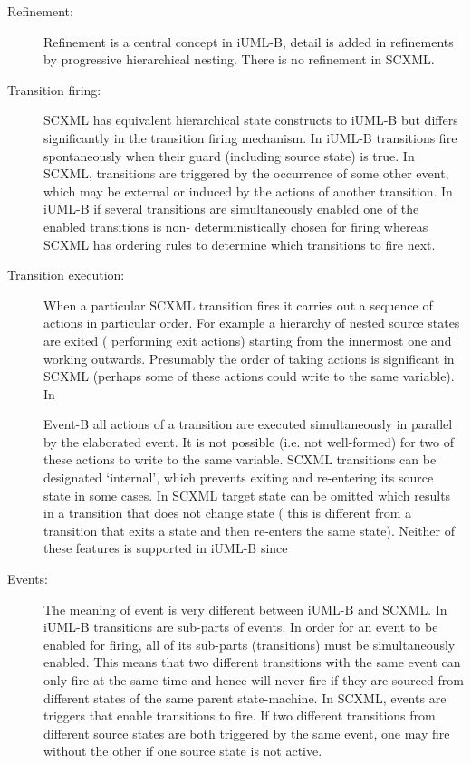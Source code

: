 \documentclass{easychair}
\begin{document}
\begin{description}
\item [Refinement:]
Refinement is a central concept in iUML-B, detail is 
added in refinements by progressive hierarchical 
nesting. There is no refinement in SCXML.

\item [Transition firing:]
SCXML has equivalent hierarchical state constructs to 
iUML-B but differs significantly in the transition 
firing mechanism. In iUML-B transitions fire 
spontaneously when their guard (including source state) 
is true. In SCXML, transitions are triggered by the 
occurrence of some other event, which may be external 
or induced by the actions of another transition. 
In iUML-B if several transitions are simultaneously 
enabled one of the enabled transitions is non-
deterministically chosen for firing whereas SCXML has 
ordering rules to determine which transitions to fire 
next.

\item [Transition execution:]
When a particular SCXML transition fires it carries out 
a sequence of actions in particular order. For example 
a hierarchy of nested source states are exited (
performing exit actions) starting from the innermost 
one and working outwards. Presumably the order of 
taking actions is significant in SCXML (perhaps some of 
these actions could write to the same variable). In 

Event-B all actions of a transition are executed 
simultaneously in parallel by the elaborated event. It 
is not possible (i.e. not well-formed) for two of these 
actions to write to the same variable.
SCXML transitions can be designated ‘internal’, which 
prevents exiting and re-entering its source state in 
some cases. In SCXML target state can be omitted which 
results in a transition that does not change state (
this is different from a transition that exits a state 
and then re-enters the same state).
Neither of these features is supported in iUML-B since 

\item [Events:]
The meaning of event is very different between iUML-B 
and SCXML. In iUML-B transitions are sub-parts of 
events. In order for an event to be enabled for firing, 
all of its sub-parts (transitions) must be 
simultaneously enabled. This means that two different 
transitions with the same event can only fire at the 
same time and hence will never fire if they are sourced 
from different states of the same parent state-machine. 
In SCXML, events are triggers that enable transitions 
to fire. If two different transitions from different 
source states are both triggered by the same event, one 
may fire without the other if one source state is not 
active.


\end{description}
\end{document}
